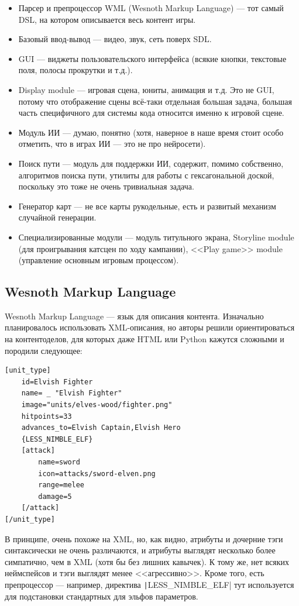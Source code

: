 \documentclass{../../text-style}
\begin{document}
\begin{itemize}
    \item Парсер и препроцессор WML (Wesnoth Markup Language) --- тот самый DSL, на котором описывается весь контент игры.
    \item Базовый ввод-вывод --- видео, звук, сеть поверх SDL.
    \item GUI --- виджеты пользовательского интерфейса (всякие кнопки, текстовые поля, полосы прокрутки и т.д.).
    \item Display module --- игровая сцена, юниты, анимация и т.д. Это не GUI, потому что отображение сцены всё-таки отдельная большая задача, большая часть специфичного для системы кода относится именно к игровой сцене.
    \item Модуль ИИ --- думаю, понятно (хотя, наверное в наше время стоит особо отметить, что в играх ИИ --- это не про нейросети).
    \item Поиск пути --- модуль для поддержки ИИ, содержит, помимо собственно, алгоритмов поиска пути, утилиты для работы с гексагональной доской, поскольку это тоже не очень тривиальная задача.
    \item Генератор карт --- не все карты рукодельные, есть и развитый механизм случайной генерации.
    \item Специализированные модули --- модуль титульного экрана, Storyline module (для проигрывания катсцен по ходу кампании), <<Play game>> module (управление основным игровым процессом).
\end{itemize}

\subsection{Wesnoth Markup Language}

Wesnoth Markup Language --- язык для описания контента. Изначально планировалось использовать XML-описания, но авторы решили ориентироваться на контентоделов, для которых даже HTML или Python кажутся сложными и породили следующее:

\begin{verbatim}
[unit_type]
    id=Elvish Fighter
    name= _ "Elvish Fighter"
    image="units/elves-wood/fighter.png"
    hitpoints=33
    advances_to=Elvish Captain,Elvish Hero
    {LESS_NIMBLE_ELF}
    [attack]
        name=sword
        icon=attacks/sword-elven.png
        range=melee
        damage=5
    [/attack]
[/unit_type]
\end{verbatim}

В принципе, очень похоже на XML, но, как видно, атрибуты и дочерние тэги синтаксически не очень различаются, и атрибуты выглядят несколько более симпатично, чем в XML (хотя бы без лишних кавычек). К тому же, нет всяких неймспейсов и тэги выглядят менее <<агрессивно>>. Кроме того, есть препроцессор --- например, директива \texttt|{LESS_NIMBLE_ELF}| тут используется для подстановки стандартных для эльфов параметров.
\end{document}
